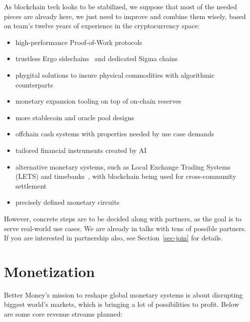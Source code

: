 \documentclass{llncs}   %
\begin{document}
As blockchain tech looks to be stabilized, we suppose that most of the needed pieces are already here, we just need to
improve and combine them wisely, based on team's twelve years of experience in the cryptocurrency space:

\begin{itemize}
  \item high-performance Proof-of-Work protocols~~\cite{prism,inputblocks}
  \item trustless Ergo sidechains~\cite{sidechains} and dedicated Sigma chains~\cite{sigmachains}
  \item phygital solutions to insure physical commodities with algorithmic counterparts~\cite{phygital}
  \item monetary expansion tooling on top of on-chain reserves~\cite{chaincash}
  \item more stablecoin and oracle pool designs
  \item offchain cash systems with properties needed by use case demands
  \item tailored financial instruments created by AI
  \item alternative monetary systems, such as Local Exchange Trading Systems (LETS) and timebanks~\cite{mcquaid2004review},
        with blockchain being used for cross-community settlement
  \item precisely defined monetary circuits
\end{itemize}

However, concrete steps are to be decided along with partners, as the goal is to serve real-world use cases. We are already
in talks with tens of possible partners. If you are interested in partnership also, see Section~\ref{sec-join} for details.

\section{Monetization}
\label{sec-monetization}

Better Money’s mission to reshape global monetary systems is about disrupting biggest world's markets, which is bringing
a lot of possibilities to profit. Below are some core revenue streams planned:
\end{document}
